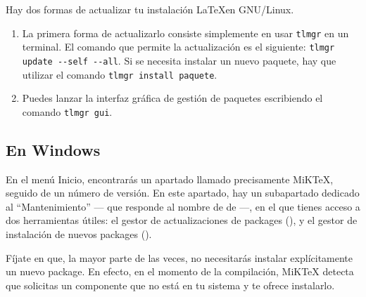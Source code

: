 Hay dos formas de actualizar tu instalación \LaTeX en GNU/Linux.

\begin{enumerate}
\item La primera forma de actualizarlo consiste simplemente en usar \verb|tlmgr| en un terminal. El comando que permite la actualización es el siguiente:
\verb|tlmgr update --self --all|. Si se necesita instalar un nuevo paquete, hay que utilizar el comando \verb|tlmgr install paquete|.
\item Puedes lanzar la interfaz gráfica de gestión de paquetes escribiendo el comando \verb|tlmgr gui|.
\end{enumerate}

\subsection{En Windows}

En el menú Inicio, encontrarás un apartado llamado precisamente MiKTeX, seguido de un número de versión. En este apartado, hay un subapartado dedicado al \enquote{Mantenimiento} --- que responde al nombre de de  ---, en el que tienes acceso a dos herramientas útiles: el gestor de actualizaciones de packages (), y el gestor de instalación de nuevos packages ().

Fíjate en que, la mayor parte de las veces, no necesitarás instalar explícitamente un nuevo package. En efecto, en el momento de la compilación, MiKTeX detecta que solicitas un componente que no está en tu sistema y te ofrece instalarlo.
